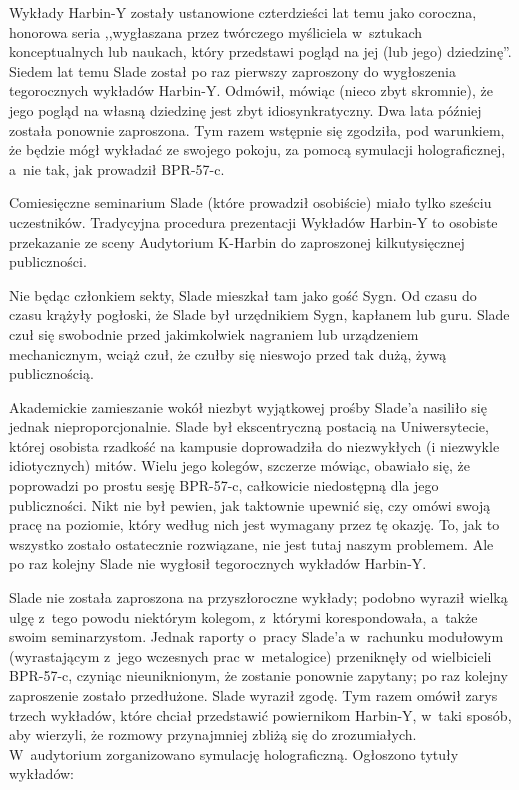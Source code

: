 \documentclass[oneside,polish,11pt,rmheadings]{mwbk}
\begin{document}
Wykłady Harbin-Y zostały ustanowione czterdzieści lat temu jako coroczna, honorowa seria ,,wygłaszana przez twórczego myśliciela w~sztukach konceptualnych lub naukach, który przedstawi pogląd na jej (lub jego) dziedzinę''. Siedem lat temu Slade został po raz pierwszy zaproszony do wygłoszenia tegorocznych wykładów Harbin-Y. Odmówił, mówiąc (nieco zbyt skromnie), że jego pogląd na własną dziedzinę jest zbyt idiosynkratyczny. Dwa lata później została ponownie zaproszona. Tym razem wstępnie się zgodziła, pod warunkiem, że będzie mógł wykładać ze swojego pokoju, za pomocą symulacji holograficznej, a~nie tak, jak prowadził BPR-57-c. 

Comiesięczne seminarium Slade (które prowadził osobiście) miało tylko sześciu uczestników. Tradycyjna procedura prezentacji Wykładów Harbin-Y to osobiste przekazanie ze sceny Audytorium K-Harbin do zaproszonej kilkutysięcznej publiczności. 

Nie będąc członkiem sekty, Slade mieszkał tam jako gość Sygn. Od czasu do czasu krążyły pogłoski, że Slade był urzędnikiem Sygn, kapłanem lub guru. Slade czuł się swobodnie przed jakimkolwiek nagraniem lub urządzeniem mechanicznym, wciąż czuł, że czułby się nieswojo przed tak dużą, żywą publicznością. 

Akademickie zamieszanie wokół niezbyt wyjątkowej prośby Slade'a nasiliło się jednak nieproporcjonalnie. Slade był ekscentryczną postacią na Uniwersytecie, której osobista rzadkość na kampusie doprowadziła do niezwykłych (i niezwykle idiotycznych) mitów. Wielu jego kolegów, szczerze mówiąc, obawiało się, że poprowadzi po prostu sesję BPR-57-c, całkowicie niedostępną dla jego publiczności. Nikt nie był pewien, jak taktownie upewnić się, czy omówi swoją pracę na poziomie, który według nich jest wymagany przez tę okazję. To, jak to wszystko zostało ostatecznie rozwiązane, nie jest tutaj naszym problemem. Ale po raz kolejny Slade nie wygłosił tegorocznych wykładów Harbin-Y. 

Slade nie została zaproszona na przyszłoroczne wykłady; podobno wyraził wielką ulgę z~tego powodu niektórym kolegom, z~którymi korespondowała, a~także swoim seminarzystom. Jednak raporty o~pracy Slade'a w~rachunku modułowym (wyrastającym z~jego wczesnych prac w~metalogice) przeniknęły od wielbicieli BPR-57-c, czyniąc nieuniknionym, że zostanie ponownie zapytany; po raz kolejny zaproszenie zostało przedłużone. Slade wyraził zgodę. Tym razem omówił zarys trzech wykładów, które chciał przedstawić powiernikom Harbin-Y, w~taki sposób, aby wierzyli, że rozmowy przynajmniej zbliżą się do zrozumiałych. W~audytorium zorganizowano symulację holograficzną. Ogłoszono tytuły wykładów: 
\end{document}
